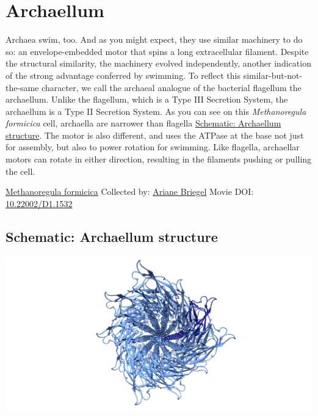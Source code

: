 \documentclass[]{tufte-book}
\begin{document}
\hypertarget{archaellum}{%
\section{Archaellum}\label{archaellum}}

Archaea swim, too. And as you might expect, they use similar machinery to do so: an envelope-embedded motor that spins a long extracellular filament. Despite the structural similarity, the machinery evolved independently, another indication of the strong advantage conferred by swimming. To reflect this similar-but-not-the-same character, we call the archaeal analogue of the bacterial flagellum the archaellum. Unlike the flagellum, which is a Type III Secretion System, the archaellum is a Type II Secretion System. As you can see on this \emph{Methanoregula formicica} cell, archaella are narrower than flagella \protect\hyperlink{Archaellum_structure}{Schematic: Archaellum structure}. The motor is also different, and uses the ATPase at the base not just for assembly, but also to power rotation for swimming. Like flagella, archaellar motors can rotate in either direction, resulting in the filaments pushing or pulling the cell.



\hypertarget{htmlwidget-4886f7971c9d42c8d191}{}

\label{fig:6-8}\protect\hyperlink{tree}{Methanoregula formicica} Collected by: \protect\hyperlink{ariane_briegel}{Ariane Briegel} Movie DOI: \href{https://doi.org/10.22002/D1.1532}{10.22002/D1.1532}

\hypertarget{Archaellum_structure}{%
\subsection*{Schematic: Archaellum structure}\label{Archaellum_structure}}

\includegraphics{img/schematics/6_8_1}
\end{document}
